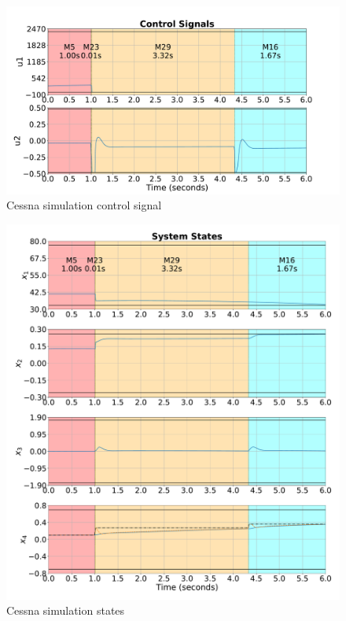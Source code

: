 \begin{figure}[ht!]
  \centering \captionsetup{justification=centering}
  \includegraphics[height=0.3\textheight]{imgs/cessna-u}
  \caption{Cessna simulation control signal}%
  \label{fig:cessna-u}
\end{figure}

\begin{figure}[ht!]
  \centering \captionsetup{justification=centering}
  \includegraphics[height=0.6\textheight]{imgs/cessna-x}
  \caption{Cessna simulation states}%
  \label{fig:cessna-x}
\end{figure}

